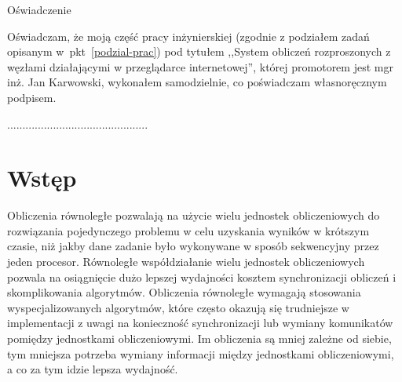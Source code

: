 \documentclass[a4paper,11pt,twoside]{report}
\theoremstyle{definition}
\newcommand{\tytul}{System obliczeń rozproszonych z węzłami działającymi w przeglądarce internetowej}
\newcommand{\type}{inżyniers} %
\newcommand{\supervisor}{mgr inż. Jan Karwowski}
\begin{document}
\par\vspace{5cm}

\begin{center}
Oświadczenie
\end{center}

\indent Oświadczam, że moją część pracy \type kiej (zgodnie z podziałem zadań opisanym w~pkt~\ref{podzial-prac}) pod
tytułem ,,\tytul '', której promotorem jest \supervisor , wykonałem
samodzielnie, co poświadczam własnoręcznym podpisem.
\vspace{2cm}


\begin{flushright}
  \begin{minipage}{50mm}
    \begin{center}
      ..............................................

    \end{center}
  \end{minipage}
\end{flushright}

\thispagestyle{empty}
\newpage

\null\thispagestyle{empty}\newpage


\tableofcontents
\thispagestyle{empty}


\null\thispagestyle{empty}\newpage
\pagestyle{fancy}
\setcounter{page}{11} %

\chapter{Wstęp}
    \label{wstep}

    Obliczenia równoległe pozwalają na użycie wielu jednostek obliczeniowych do rozwiązania pojedynczego problemu w celu uzyskania wyników w krótszym czasie, niż jakby dane zadanie było wykonywane w sposób sekwencyjny przez jeden procesor.
    Równoległe współdziałanie wielu jednostek obliczeniowych pozwala na osiągnięcie dużo lepszej wydajności
    kosztem synchronizacji obliczeń i skomplikowania algorytmów.
    Obliczenia równoległe wymagają stosowania wyspecjalizowanych algorytmów, które często okazują się
    trudniejsze w implementacji z uwagi na konieczność synchronizacji lub wymiany komunikatów pomiędzy jednostkami obliczeniowymi.
    Im obliczenia są mniej zależne od siebie,
    tym mniejsza potrzeba wymiany informacji między jednostkami obliczeniowymi, a co za tym idzie lepsza wydajność.
    
\end{document}
